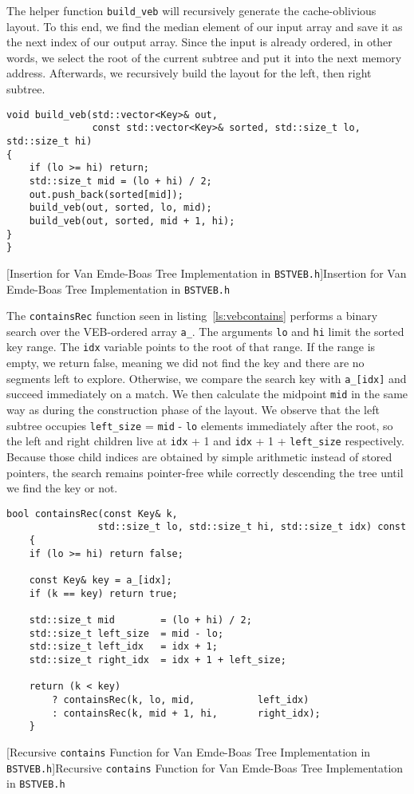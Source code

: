 \documentclass{article}
\begin{document}
The helper function \texttt{build\_veb} will recursively generate the cache-oblivious layout. To this end, we find the median element of our input array and save it as the next index of our output array. Since the input is already ordered, in other words, we select the root of the current subtree and put it into the next memory address. Afterwards, we recursively build the layout for the left, then right subtree. 
\begin{lstlisting}
void build_veb(std::vector<Key>& out,
               const std::vector<Key>& sorted, std::size_t lo, std::size_t hi)
{
    if (lo >= hi) return;                       
    std::size_t mid = (lo + hi) / 2;            
    out.push_back(sorted[mid]);                 
    build_veb(out, sorted, lo, mid);            
    build_veb(out, sorted, mid + 1, hi);        
}
} 
\end{lstlisting}
[Insertion for Van Emde-Boas Tree Implementation in \texttt{BSTVEB.h}]{Insertion for Van Emde-Boas Tree Implementation in \texttt{BSTVEB.h}}
\label{ls:vebinsert}

The \texttt{containsRec} function seen in listing~\ref{ls:vebcontains} performs a binary search over the VEB-ordered array \texttt{a\_}. The arguments \texttt{lo} and \texttt{hi} limit the sorted key range. The \texttt{idx} variable points to the root of that range. If the range is empty, we return false, meaning we did not find the key and there are no segments left to explore. Otherwise, we compare the search key with \texttt{a\_[idx]} and succeed immediately on a match. We then calculate the midpoint \texttt{mid} in the same way as during the construction phase of the layout. We observe that the left subtree occupies \texttt{left\_size} = \texttt{mid} - \texttt{lo} elements immediately after the root, so the left and right children live at \texttt{idx} + 1 and \texttt{idx} + 1 + \texttt{left\_size} respectively.
Because those child indices are obtained by simple arithmetic instead of stored pointers, the search remains pointer-free while correctly descending the tree until we find the key or not.
\begin{lstlisting}
bool containsRec(const Key& k,
                std::size_t lo, std::size_t hi, std::size_t idx) const
    {
    if (lo >= hi) return false;            

    const Key& key = a_[idx];
    if (k == key) return true;

    std::size_t mid        = (lo + hi) / 2;
    std::size_t left_size  = mid - lo;    
    std::size_t left_idx   = idx + 1;   
    std::size_t right_idx  = idx + 1 + left_size;

    return (k < key)
        ? containsRec(k, lo, mid,           left_idx)
        : containsRec(k, mid + 1, hi,       right_idx);
    }
\end{lstlisting}
[Recursive \texttt{contains} Function for Van Emde-Boas Tree Implementation in \texttt{BSTVEB.h}]{Recursive \texttt{contains} Function for Van Emde-Boas Tree Implementation in \texttt{BSTVEB.h}}
\label{ls:vebcontains}
\end{document}
